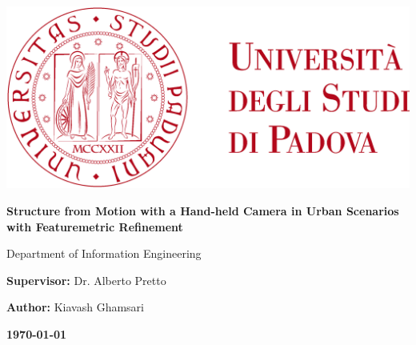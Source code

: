 \documentclass{article}
\date{\today}
\begin{document}
\begin{titlepage}
  \centering

  \includegraphics[width=1\textwidth]{images/unipd}

  \vspace{2cm}

  \LARGE\textbf{Structure from Motion with a Hand-held Camera in Urban Scenarios with Featuremetric Refinement}

  \vspace{2cm}

  Department of Information Engineering

  \vspace{1cm}

  \Large\textbf{Supervisor:} Dr. Alberto Pretto

  \textbf{Author:} Kiavash Ghamsari

  \vfill

  \vspace{2cm}


  \Large\textbf{\today}
\end{titlepage}
\end{document}
